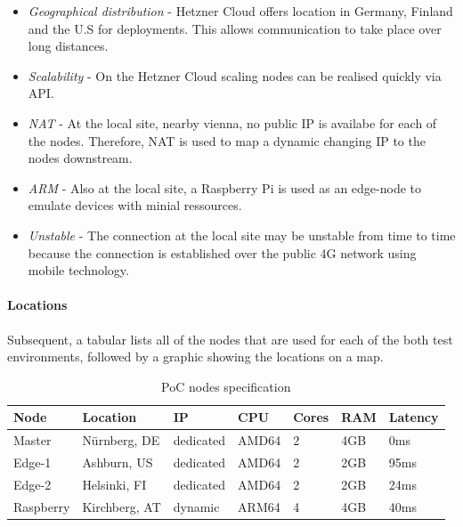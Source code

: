 \documentclass[MSC,Master,english]{twbook}%
\begin{document}
\begin{itemize}
    \item \textit{Geographical distribution} - Hetzner Cloud offers location in Germany, Finland and the U.S for deployments. This allows communication to take place over long distances.
    \item \textit{Scalability} - On the Hetzner Cloud scaling nodes can be realised quickly via \ac{API}.
    \item \textit{\ac{NAT}} - At the local site, nearby vienna, no public IP is availabe for each of the nodes. Therefore, \ac{NAT} is used to map a dynamic changing IP to the nodes downstream.
    \item \textit{\ac{ARM}} - Also at the local site, a Raspberry Pi is used as an edge-node to emulate devices with minial ressources.
    \item \textit{Unstable} - The connection at the local site may be unstable from time to time because the connection is established over the public 4G network using mobile technology.
\end{itemize}

\paragraph{Locations} Subsequent, a tabular lists all of the nodes that are used for each of the both test environments, followed by a graphic showing the locations on a map.

\begin{table}[ht]
    \begin{center}
        \begin{tabular}{|l|l|l|l|l|l|l|}
            \hline
            Node & Location & IP & CPU & Cores & RAM & Latency \\
            \hline
            Master & Nürnberg, DE & dedicated & AMD64 & 2 & 4GB & 0ms \\
            Edge-1 & Ashburn, US & dedicated & AMD64 & 2 & 2GB & 95ms \\
            Edge-2 & Helsinki, FI &  dedicated & AMD64 & 2 & 2GB & 24ms \\
            Raspberry & Kirchberg, AT & dynamic & ARM64 & 4 & 4GB & 40ms \\
            \hline
        \end{tabular}
        \caption{\ac{PoC} nodes specification}
        \label{tab:poc-nodes}
    \end{center}
\end{table}
\end{document}
